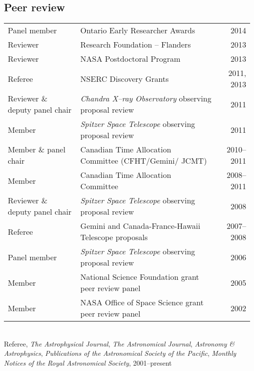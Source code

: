 \documentclass[12pt]{article}
\begin{document}
\subsection{Peer review}
\begin{tabularx}{\textwidth}{lXr}
Panel member & Ontario Early Researcher Awards & 2014\\
Reviewer& Research Foundation -- Flanders& 2013\\
Reviewer& NASA Postdoctoral Program& 2013\\
Referee& NSERC Discovery Grants& 2011, 2013\\
Reviewer \& deputy panel chair& {\it Chandra X--ray Observatory\/} observing proposal review& 2011\\
Member& {\it Spitzer Space Telescope\/} observing proposal review& 2011\\
Member \& panel chair& Canadian Time Allocation Committee (CFHT/Gemini/ JCMT)& 2010--2011\\
Member& Canadian Time Allocation Committee& 2008--2011\\
Reviewer \& deputy panel chair& {\it Spitzer Space Telescope\/} observing proposal review& 2008\\
Referee& Gemini and Canada-France-Hawaii Telescope proposals& 2007--2008\\
Panel member& {\it Spitzer Space Telescope\/} observing proposal review& 2006\\
Member& National Science Foundation grant peer review panel& 2005\\
Member& NASA Office of Space Science grant peer review panel& 2002\\
\end{tabularx}\\
\vspace{0.3cm}
Referee, {\it The Astrophysical Journal}, {\it The Astronomical Journal}, {\it Astronomy \& Astrophysics},
{\it Publications of the Astronomical Society of the Pacific}, {\it Monthly Notices of the Royal Astronomical Society},
2001--present
\end{document}
